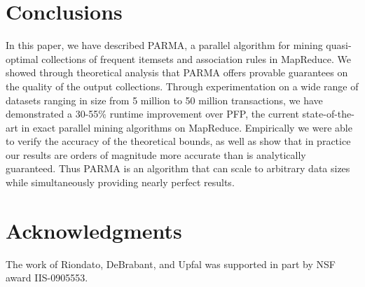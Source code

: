 \section{Conclusions}
\label{sec:parmaconc}

In this paper, we have described PARMA, a parallel algorithm for mining
quasi-optimal collections of frequent itemsets and association rules in MapReduce.
We showed through theoretical analysis that PARMA offers provable guarantees on
the quality of the output collections. Through experimentation on a wide range
of datasets ranging in size from 5 million to 50 million transactions,
we have demonstrated a 30-55\% runtime improvement over PFP, the
current state-of-the-art in exact parallel mining algorithms on MapReduce.
Empirically we were able to verify the accuracy of the theoretical bounds, as
well as show that in practice our results are orders of magnitude more accurate
than is analytically guaranteed. Thus PARMA is an algorithm that can scale to
arbitrary data sizes while simultaneously providing nearly perfect results. 

\section{Acknowledgments}
\label{sec:parmaack}
The work of Riondato, DeBrabant, and Upfal was supported in part by NSF award IIS-0905553.
